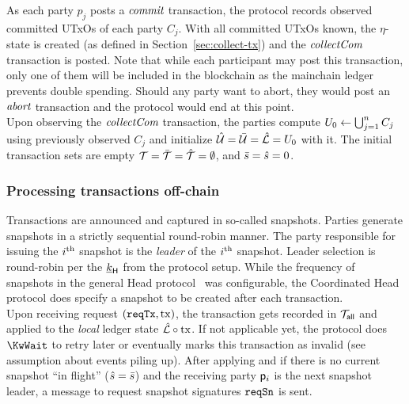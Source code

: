 \quad As each party $p_{j}$ posts a
$\textit{commit}$ transaction, the protocol records observed committed UTxOs of each
party $C_j$. With all committed UTxOs known, the $\eta$-state is created (as
defined in Section~\ref{sec:collect-tx}) and the $\textit{collectCom}$ transaction is
posted. Note that while each participant may post this transaction, only one of
them will be included in the blockchain as the mainchain ledger prevents double
spending. Should any party want to abort, they would post an $\textit{abort}$
transaction and the protocol would end at this point.\\

\quad Upon observing the $\textit{collectCom}$
transaction, the parties compute $U_{0} \gets \bigcup_{j=1}^{n} C_j$ using
previously observed $C_j$ and initialize $\hat {\mathcal U} = \bar {\mathcal U} = \hat {\mathcal L} = U_{0}$
with it. The initial transaction sets are empty
${\mathcal T} = \bar {\mathcal T} =\hat {\mathcal T} =\emptyset$, and $\bar s = \hat s = 0$.

\subsubsection{Processing transactions off-chain}

Transactions are announced and captured in so-called snapshots. Parties generate
snapshots in a strictly sequential round-robin manner. The party responsible for
issuing the $i^{\text{th}}$ snapshot is the \emph{leader} of the $i^{\text{th}}$ snapshot.
Leader selection is round-robin per the $\underline{k}_{\mathsf{H}}$ from the protocol setup.
While the frequency of snapshots in the general Head protocol~\cite{hydrahead20}
was configurable, the Coordinated Head protocol does specify a snapshot to be
created after each transaction.\\

\quad Upon receiving request $(\mathtt{reqTx},\mathrm{tx})$, the transaction
gets recorded in ${\mathcal T}_{\mathsf{all}}$ and applied to the \emph{local} ledger
state $\hat {\mathcal L} \circ \mathrm{tx}$. If not applicable yet, the protocol does $\KwWait$
to retry later or eventually marks this transaction as invalid (see assumption
about events piling up). After applying and if there is no current snapshot ``in
flight'' ($\hat s = \bar s$) and the receiving party $\mathsf p_{i}$ is the next
snapshot
leader, a message to request snapshot signatures $\mathtt{reqSn}$ is sent. \\

 \\

